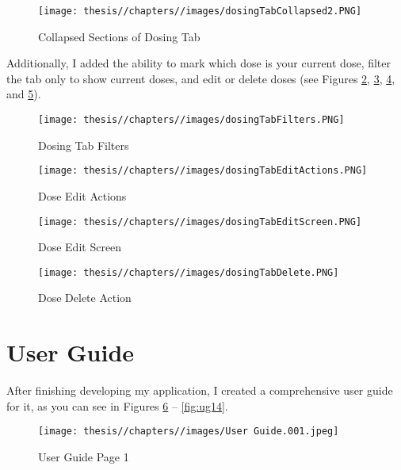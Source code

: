\begin{figure} [H]
    \centering
    \texttt{[image: thesis//chapters//images/dosingTabCollapsed2.PNG]}
    \caption{Collapsed Sections of Dosing Tab}
         \label{fig:sections2}

\end{figure}

Additionally, I added the ability to mark which dose is your current dose, filter the tab only to show current doses, and edit or delete doses (see Figures \ref{fig:filters}, \ref{fig:edit}, \ref{fig:edit2}, and \ref{fig:delete}).

\begin{figure} [H]
    \centering
    \texttt{[image: thesis//chapters//images/dosingTabFilters.PNG]}
    \caption{Dosing Tab Filters}
         \label{fig:filters}
\end{figure}

\begin{figure} [H]
    \centering
    \texttt{[image: thesis//chapters//images/dosingTabEditActions.PNG]}
    \caption{Dose Edit Actions}
         \label{fig:edit}
\end{figure}

\begin{figure} [H]
    \centering
    \texttt{[image: thesis//chapters//images/dosingTabEditScreen.PNG]}
    \caption{Dose Edit Screen}
         \label{fig:edit2}
\end{figure}

\begin{figure} [H]
    \centering
    \texttt{[image: thesis//chapters//images/dosingTabDelete.PNG]}
    \caption{Dose Delete Action}
         \label{fig:delete}
\end{figure}

\section{User Guide}

After finishing developing my application, I created a comprehensive user guide for it, as you can see in Figures \ref{fig:ug1} – \ref{fig:ug14}.

\begin{figure} [H]
    \centering
    \texttt{[image: thesis//chapters//images/User Guide.001.jpeg]}
    \caption{User Guide Page 1}
    \label{fig:ug1}
\end{figure}

